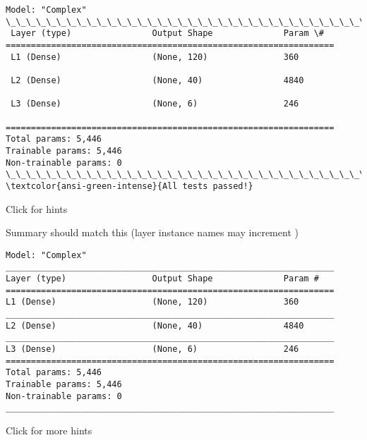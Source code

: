 \documentclass[11pt]{article}
\begin{document}
    \begin{Verbatim}[commandchars=\\\{\}]
Model: "Complex"
\_\_\_\_\_\_\_\_\_\_\_\_\_\_\_\_\_\_\_\_\_\_\_\_\_\_\_\_\_\_\_\_\_\_\_\_\_\_\_\_\_\_\_\_\_\_\_\_\_\_\_\_\_\_\_\_\_\_\_\_\_\_\_\_\_
 Layer (type)                Output Shape              Param \#
=================================================================
 L1 (Dense)                  (None, 120)               360

 L2 (Dense)                  (None, 40)                4840

 L3 (Dense)                  (None, 6)                 246

=================================================================
Total params: 5,446
Trainable params: 5,446
Non-trainable params: 0
\_\_\_\_\_\_\_\_\_\_\_\_\_\_\_\_\_\_\_\_\_\_\_\_\_\_\_\_\_\_\_\_\_\_\_\_\_\_\_\_\_\_\_\_\_\_\_\_\_\_\_\_\_\_\_\_\_\_\_\_\_\_\_\_\_
\textcolor{ansi-green-intense}{All tests passed!}
    \end{Verbatim}

    Click for hints

Summary should match this (layer instance names may increment )

\begin{verbatim}
Model: "Complex"
_________________________________________________________________
Layer (type)                 Output Shape              Param #   
=================================================================
L1 (Dense)                   (None, 120)               360       
_________________________________________________________________
L2 (Dense)                   (None, 40)                4840      
_________________________________________________________________
L3 (Dense)                   (None, 6)                 246       
=================================================================
Total params: 5,446
Trainable params: 5,446
Non-trainable params: 0
_________________________________________________________________
\end{verbatim}

Click for more hints
\end{document}
